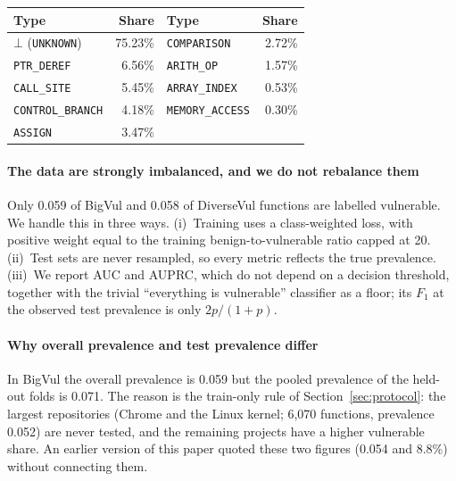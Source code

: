 \documentclass[pdflatex,sn-basic]{sn-jnl}
\let\toprule\hline\let\midrule\hline\let\bottomrule\hline\let\botrule\hline
\theoremstyle{thmstyleone}%
\newcommand{\numbigvulPrev}{0.059}
\newcommand{\numbigvulTestPrev}{0.071}
\newcommand{\numbigvulTrainOnlyN}{6,070}
\newcommand{\numbigvulTrainOnlyPrev}{0.052}
\newcommand{\numdiversevulPrev}{0.058}
\begin{document}
\begin{tableorg}[t]
\centering
\caption{Node-type distribution under $\phi_8$ (BigVul sample). $\bot$
(\texttt{UNKNOWN}) nodes carry no operation label but keep their grammar kind.}
\label{tab:node_dist}
\begin{tabular}{lr@{\hskip 2em}lr}
\toprule
Type & Share & Type & Share \\
\midrule
$\bot$ (\texttt{UNKNOWN}) & 75.23\% & \texttt{COMPARISON} & 2.72\% \\
\texttt{PTR\_DEREF} & 6.56\% & \texttt{ARITH\_OP} & 1.57\% \\
\texttt{CALL\_SITE} & 5.45\% & \texttt{ARRAY\_INDEX} & 0.53\% \\
\texttt{CONTROL\_BRANCH} & 4.18\% & \texttt{MEMORY\_ACCESS} & 0.30\% \\
\texttt{ASSIGN} & 3.47\% &  &  \\
\bottomrule
\end{tabular}
\end{tableorg}

\paragraph{The data are strongly imbalanced, and we do not rebalance them}
Only \numbigvulPrev{} of BigVul and \numdiversevulPrev{} of DiverseVul
functions are labelled vulnerable. We handle this in three ways. (i)~Training
uses a class-weighted loss, with positive weight equal to the training
benign-to-vulnerable ratio capped at 20. (ii)~Test sets are never resampled, so
every metric reflects the true prevalence. (iii)~We report AUC and AUPRC, which
do not depend on a decision threshold, together with the trivial
``everything is vulnerable'' classifier as a floor; its $F_1$ at the observed
test prevalence is only $2p/(1{+}p)$.

\paragraph{Why overall prevalence and test prevalence differ} In BigVul the
overall prevalence is \numbigvulPrev{} but the pooled prevalence of the
held-out folds is \numbigvulTestPrev{}. The reason is the train-only rule of
Section~\ref{sec:protocol}: the largest repositories (Chrome and the Linux
kernel; \numbigvulTrainOnlyN{} functions, prevalence \numbigvulTrainOnlyPrev{})
are never tested, and the remaining projects have a higher vulnerable share. An
earlier version of this paper quoted these two figures (0.054 and 8.8\%) without
connecting them.
\end{document}
